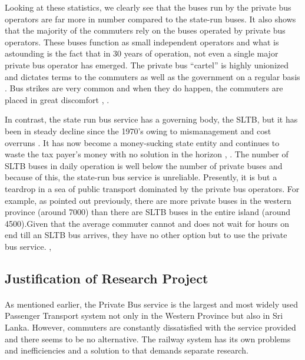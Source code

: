 \documentclass[12pt, oneside]{report}
\begin{document}
Looking at these statistics, we clearly see that the buses run by the private bus operators are far more in number compared to the state-run buses. It also shows that the majority of the commuters rely on the buses operated by private bus operators. These buses function as small independent operators and what is astounding is the fact that in 30 years of operation, not even a single major private bus operator has emerged. The private bus “cartel” is highly unionized and dictates terms to the commuters as well as the government on a regular basis \citep{AdaDerana2012}. Bus strikes are very common and when they do happen, the commuters are placed in great discomfort \citep{Samarajiva2012}, \citep{ColomboPage2012}.

In contrast, the state run bus service has a governing body, the SLTB, but it has been in steady decline since the 1970’s owing to mismanagement and cost overruns \citep{AnswersDotCom2012}. It has now become a money-sucking state entity and continues to waste the tax payer's money with no solution in the horizon \citep{LBO2011}, \citep{Sirimanne2013}. The number of SLTB buses in daily operation is well below the number of private buses and because of this, the state-run bus service is unreliable. Presently, it is but a teardrop in a sea of public transport dominated by the private bus operators. For example, as pointed out previously, there are more private buses in the western province (around 7000) than there are SLTB buses in the entire island (around 4500).Given that the average commuter cannot and does not wait for hours on end till an SLTB bus arrives, they have no other option but to use the private bus service. \citep{Wijayapala2012}, \citep{Azwer2012}

\subsection{Justification of Research Project}

\paragraph{} As mentioned earlier, the Private Bus service is the largest and most widely used Passenger Transport system not only in the Western Province but also in Sri Lanka. However, commuters are constantly dissatisfied with the service provided and there seems to be no alternative. The railway system has its own problems and inefficiencies and a solution to that demands separate research.
\end{document}
